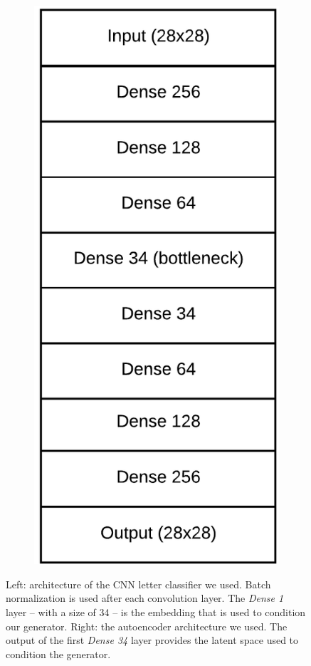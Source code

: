 \begin{figure}[!htbp]
\begin{subfigure}{0.4\textwidth}
    \end{subfigure}
    ~
    \begin{subfigure}{0.4\textwidth}
        \includegraphics[scale=1.0]{images/gbem/autoenc.png}
    \end{subfigure}
    \caption{Left: architecture of the CNN letter classifier we used. Batch normalization is used after each convolution layer. The \textit{Dense 1} layer -- with a size of 34 -- is the embedding that is used to condition our generator. Right: the autoencoder architecture we used. The output of the first \textit{Dense 34} layer provides the latent space used to condition the generator.}
    \label{fig:architectures}
\end{figure}

